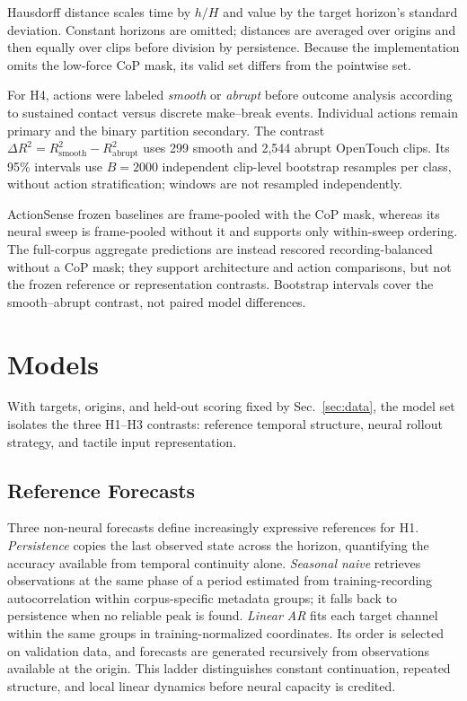 \documentclass[letterpaper, 10 pt, conference]{ieeeconf}
\newcommand{\Rtwo}{R^{2}}
\newcommand{\dRtwo}{\Delta R^{2}}
\begin{document}
Hausdorff distance scales time by $h/H$ and value by the target horizon's standard deviation. Constant horizons are omitted; distances are averaged over origins and then equally over clips before division by persistence. Because the implementation omits the low-force CoP mask, its valid set differs from the pointwise set.

For H4, actions were labeled \emph{smooth} or \emph{abrupt} before outcome analysis according to sustained contact versus discrete make--break events. Individual actions remain primary and the binary partition secondary. The contrast $\dRtwo=\Rtwo_{\mathrm{smooth}}-\Rtwo_{\mathrm{abrupt}}$ uses 299 smooth and 2,544 abrupt OpenTouch clips. Its 95\% intervals use $B=2000$ independent clip-level bootstrap resamples per class, without action stratification; windows are not resampled independently.

ActionSense frozen baselines are frame-pooled with the CoP mask, whereas its neural sweep is frame-pooled without it and supports only within-sweep ordering. The full-corpus aggregate predictions are instead rescored recording-balanced without a CoP mask; they support architecture and action comparisons, but not the frozen reference or representation contrasts. Bootstrap intervals cover the smooth--abrupt contrast, not paired model differences.

\section{Models}
\label{sec:models}

With targets, origins, and held-out scoring fixed by Sec.~\ref{sec:data}, the model set isolates the three H1--H3 contrasts: reference temporal structure, neural rollout strategy, and tactile input representation.

\subsection{Reference Forecasts}
Three non-neural forecasts define increasingly expressive references for H1. \emph{Persistence} copies the last observed state across the horizon, quantifying the accuracy available from temporal continuity alone. \emph{Seasonal naive} retrieves observations at the same phase of a period estimated from training-recording autocorrelation within corpus-specific metadata groups; it falls back to persistence when no reliable peak is found. \emph{Linear AR} fits each target channel within the same groups in training-normalized coordinates. Its order is selected on validation data, and forecasts are generated recursively from observations available at the origin. This ladder distinguishes constant continuation, repeated structure, and local linear dynamics before neural capacity is credited.
\end{document}
